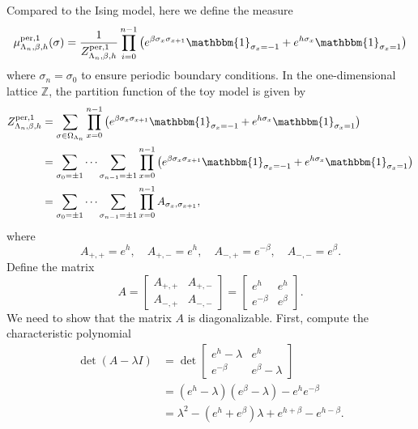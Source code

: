 \documentclass[11pt]{book}
\begin{document}
Compared to the Ising model, here we define the measure
\begin{equation}\label{measure_tm1}
\mu^{\text{per,1}}_{\Lambda_n,\beta,h}(\sigma)=\frac{1}{Z^{\text{per,1}}_{\Lambda_n,\beta,h}  }\prod_{i=0}^{n-1} \left( e^{\beta \sigma_{x}\sigma_{x+1}} \mathbbm{1}_{\sigma_x = -1} + e^{h \sigma_x} \mathbbm{1}_{\sigma_x = 1} \right)
\end{equation}
where $\sigma_n = \sigma_0$ to ensure periodic boundary conditions. In the one-dimensional lattice $\mathbb{Z}$, the partition function of the toy model is given by
\begin{equation}\label{partition_function_tm1}
\begin{aligned}
Z^{\text{per,1}}_{\Lambda_n,\beta,h}  
&= \sum_{\sigma \in \Omega_{\Lambda_n}} \prod_{x=0}^{n-1} \left( e^{\beta \sigma_{x}\sigma_{x+1}} \mathbbm{1}_{\sigma_x = -1} + e^{h \sigma_x} \mathbbm{1}_{\sigma_x = 1} \right) \\
&= \sum_{\sigma_0=\pm 1}\cdots \sum_{\sigma_{n-1}=\pm 1} \prod_{x=0}^{n-1} \left( e^{\beta \sigma_{x} \sigma_{x+1}} \mathbbm{1}_{\sigma_x = -1} + e^{h \sigma_x} \mathbbm{1}_{\sigma_x = 1} \right) \\
&= \sum_{\sigma_0=\pm 1} \cdots \sum_{\sigma_{n-1}=\pm 1} \prod_{x=0}^{n-1} A_{\sigma_x,\sigma_{x+1}},
\end{aligned}
\end{equation}
where
\[
A_{+,+} = e^h, \quad A_{+,-} = e^h, \quad A_{-,+} = e^{-\beta}, \quad A_{-,-} = e^{\beta}.
\]
Define the matrix
\[
A = \begin{bmatrix}
A_{+,+} & A_{+,-} \\
A_{-,+} & A_{-,-}
\end{bmatrix} = \begin{bmatrix}
e^h & e^h \\
e^{-\beta} & e^{\beta}
\end{bmatrix}.
\]
We need to show that the matrix $A$ is diagonalizable. First, compute the characteristic polynomial
\begin{align*}
\det(A - \lambda I) &= \det\begin{bmatrix}
e^h - \lambda & e^h \\
e^{-\beta} & e^{\beta} - \lambda
\end{bmatrix} \\
&= (e^h - \lambda)(e^{\beta} - \lambda) - e^h e^{-\beta} \\
&= \lambda^2 - (e^h + e^{\beta}) \lambda + e^{h + \beta} - e^{h - \beta}.
\end{align*}
\end{document}
